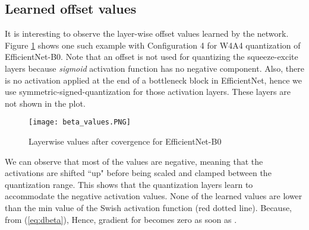\documentclass[10pt,twocolumn,letterpaper]{article}
\begin{document}
\subsection{Learned offset values}
It is interesting to observe the layer-wise offset values learned by the network. 
Figure \ref{fig:layerwise_beta} shows one such example with Configuration 4 for W4A4 quantization of EfficientNet-B0. Note that an offset is not used for quantizing the squeeze-excite layers because \textit{sigmoid} activation function has no negative component. Also, there is no activation applied at the end of a bottleneck block in EfficientNet, hence we use symmetric-signed-quantization for those activation layers. These layers are not shown in the plot.
\begin{figure}[h]
    \centering
    \texttt{[image: beta\_values.PNG]}
    \caption{Layerwise  values after covergence for EfficientNet-B0 }
    \label{fig:layerwise_beta}
\end{figure}

We can observe that most of the  values are negative, meaning that the activations are shifted ``up" before being scaled and clamped between the quantization range. This shows that the quantization layers learn to accommodate the negative activation values. None of the learned  values are lower than the min value of the Swish activation function (red dotted line). Because, from (\ref{eq:dbeta}), 
Hence, gradient for  becomes zero as soon as .
\end{document}
